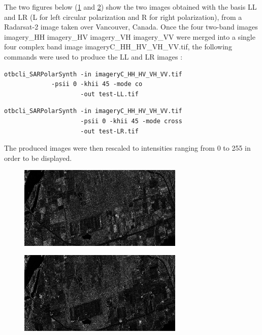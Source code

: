 The two figures below (\ref{fig:polsynthll} and \ref{fig:polsynthlr}) show the
two images obtained with the basis LL and LR (L for left circular polarization
and R for right polarization), from a Radarsat-2 image taken over
Vancouver, Canada. Once the four two-band images imagery\_HH imagery\_HV imagery\_VH
imagery\_VV were merged into a single four complex band image
imageryC\_HH\_HV\_VH\_VV.tif, the following commands were used to produce the LL
and LR images :

\begin{verbatim} 
otbcli_SARPolarSynth -in imageryC_HH_HV_VH_VV.tif 
		     -psii 0 -khii 45 -mode co 
                     -out test-LL.tif 
\end{verbatim}
\begin{verbatim} 
otbcli_SARPolarSynth -in imageryC_HH_HV_VH_VV.tif
                     -psii 0 -khii 45 -mode cross 
                     -out test-LR.tif 
\end{verbatim}

The produced images were then rescaled to intensities ranging from 0 to 255 in
order to be displayed.

\begin{figure}[!h]
\center
\includegraphics[width=0.7\textwidth]{../Art/SARImages/test-left-co-2.png}
\label{fig:polsynthll}
\end{figure}

\begin{figure}[!h]
\center
\includegraphics[width=0.7\textwidth]{../Art/SARImages/test-left-cross-2.png}
\label{fig:polsynthlr}
\end{figure}

